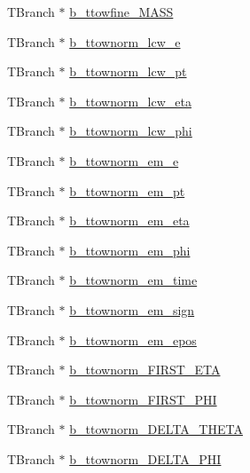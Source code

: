 \begin{DoxyCompactItemize}
T\+Branch $\ast$ \hyperlink{classXMLWriter_a12be234e7eab4a1bdfb471cf55ece8bf}{b\+\_\+ttowfine\+\_\+\+M\+A\+SS}
\item 
T\+Branch $\ast$ \hyperlink{classXMLWriter_a1b628ec7adcf2ff0574275d3ea69b947}{b\+\_\+ttownorm\+\_\+lcw\+\_\+e}
\item 
T\+Branch $\ast$ \hyperlink{classXMLWriter_a378a89c6dcb7075d3f8b52eafa60f489}{b\+\_\+ttownorm\+\_\+lcw\+\_\+pt}
\item 
T\+Branch $\ast$ \hyperlink{classXMLWriter_a688f57a0ac082c117561717ecda490b6}{b\+\_\+ttownorm\+\_\+lcw\+\_\+eta}
\item 
T\+Branch $\ast$ \hyperlink{classXMLWriter_aaad4c4081250e6a2dd85d1dd6c90e550}{b\+\_\+ttownorm\+\_\+lcw\+\_\+phi}
\item 
T\+Branch $\ast$ \hyperlink{classXMLWriter_ab5188fb79232dc100b020c4919863c26}{b\+\_\+ttownorm\+\_\+em\+\_\+e}
\item 
T\+Branch $\ast$ \hyperlink{classXMLWriter_a5711c652c04aa4115f3617dbe8ca763e}{b\+\_\+ttownorm\+\_\+em\+\_\+pt}
\item 
T\+Branch $\ast$ \hyperlink{classXMLWriter_a5957cbcfe9fca4aa9087481f3677aeeb}{b\+\_\+ttownorm\+\_\+em\+\_\+eta}
\item 
T\+Branch $\ast$ \hyperlink{classXMLWriter_a9016b1be6595abe6404e82ce12913adb}{b\+\_\+ttownorm\+\_\+em\+\_\+phi}
\item 
T\+Branch $\ast$ \hyperlink{classXMLWriter_ac0ace43d9bd01b72254cde309464a28c}{b\+\_\+ttownorm\+\_\+em\+\_\+time}
\item 
T\+Branch $\ast$ \hyperlink{classXMLWriter_a354ddcef5e469e4c3b2d799e8a6e8eb2}{b\+\_\+ttownorm\+\_\+em\+\_\+sign}
\item 
T\+Branch $\ast$ \hyperlink{classXMLWriter_afa36e91eb98500c4ea6ed13308d3dffe}{b\+\_\+ttownorm\+\_\+em\+\_\+epos}
\item 
T\+Branch $\ast$ \hyperlink{classXMLWriter_a3a597ff832ed9c8dd18c80422961cd4b}{b\+\_\+ttownorm\+\_\+\+F\+I\+R\+S\+T\+\_\+\+E\+TA}
\item 
T\+Branch $\ast$ \hyperlink{classXMLWriter_aff2d66c31866c28f1351fe3a6cf2c809}{b\+\_\+ttownorm\+\_\+\+F\+I\+R\+S\+T\+\_\+\+P\+HI}
\item 
T\+Branch $\ast$ \hyperlink{classXMLWriter_a835c176726733488d126e1db1dd77c18}{b\+\_\+ttownorm\+\_\+\+D\+E\+L\+T\+A\+\_\+\+T\+H\+E\+TA}
\item 
T\+Branch $\ast$ \hyperlink{classXMLWriter_a5d7b6cd318450c9903bdc7f780d7d677}{b\+\_\+ttownorm\+\_\+\+D\+E\+L\+T\+A\+\_\+\+P\+HI}
\item 

\end{DoxyCompactItemize}
